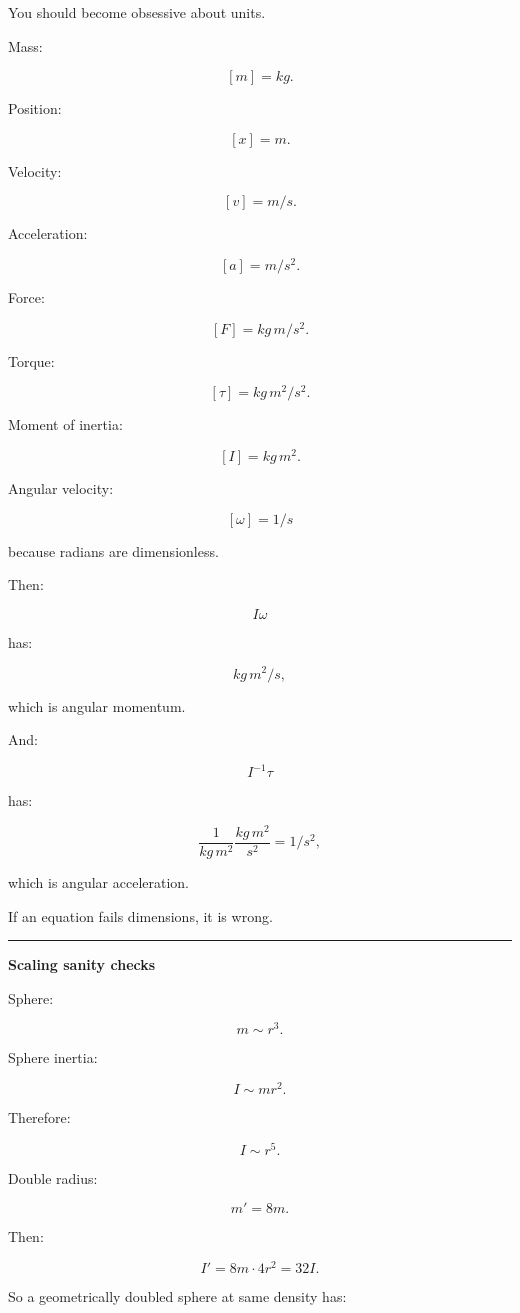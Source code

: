 You should become obsessive about units.

Mass:

\[
[m]=kg.
\]

Position:

\[
[x]=m.
\]

Velocity:

\[
[v]=m/s.
\]

Acceleration:

\[
[a]=m/s^2.
\]

Force:

\[
[F]=kg\,m/s^2.
\]

Torque:

\[
[\tau]=kg\,m^2/s^2.
\]

Moment of inertia:

\[
[I]=kg\,m^2.
\]

Angular velocity:

\[
[\omega]=1/s
\]

because radians are dimensionless.

Then:

\[
I\omega
\]

has:

\[
kg\,m^2/s,
\]

which is angular momentum.

And:

\[
I^{-1}\tau
\]

has:

\[
\frac1{kg\,m^2}
\frac{kg\,m^2}{s^2}
=
1/s^2,
\]

which is angular acceleration.

If an equation fails dimensions, it is wrong.

\begin{center}\rule{0.5\linewidth}{0.5pt}\end{center}

\textbf{Scaling sanity checks}

Sphere:

\[
m\sim r^3.
\]

Sphere inertia:

\[
I\sim mr^2.
\]

Therefore:

\[
I\sim r^5.
\]

Double radius:

\[
m'=8m.
\]

Then:

\[
I'
=
8m\cdot4r^2
=
32I.
\]

So a geometrically doubled sphere at same density has:

